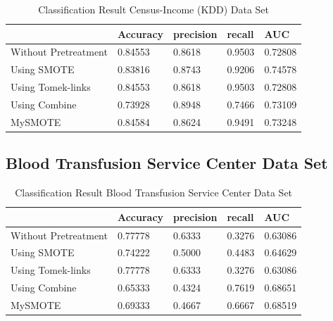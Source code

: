 \begin{table}[H]
    \caption{Classification Result Census-Income (KDD) Data Set}
    \centering
    \begin{tabular}{|l|l|l|l|l|}
    \hline
         & Accuracy & precision & recall & AUC \\ \hline
        Without Pretreatment & 0.84553 & 0.8618 & 0.9503 & 0.72808 \\ \hline
        Using SMOTE & 0.83816 & 0.8743 & 0.9206 & 0.74578 \\ \hline
        Using Tomek-links & 0.84553 & 0.8618 & 0.9503 & 0.72808 \\ \hline
        Using Combine & 0.73928 & 0.8948 & 0.7466 & 0.73109 \\ \hline
        MySMOTE & 0.84584 & 0.8624 & 0.9491 & 0.73248 \\ \hline
    \end{tabular}
\end{table}


\subsection{Blood Transfusion Service Center Data Set}

\begin{table}[H]
    \caption{Classification Result Blood Transfusion Service Center Data Set}
    \centering
    \begin{tabular}{|l|l|l|l|l|}
    \hline
         & Accuracy & precision & recall & AUC \\ \hline
        Without Pretreatment & 0.77778 & 0.6333 & 0.3276 & 0.63086 \\ \hline
        Using SMOTE & 0.74222 & 0.5000 & 0.4483 & 0.64629 \\ \hline
        Using Tomek-links & 0.77778 & 0.6333 & 0.3276 & 0.63086 \\ \hline
        Using Combine & 0.65333 & 0.4324 & 0.7619 & 0.68651 \\ \hline
        MySMOTE & 0.69333 & 0.4667 & 0.6667 & 0.68519 \\ \hline
    \end{tabular}
\end{table}
